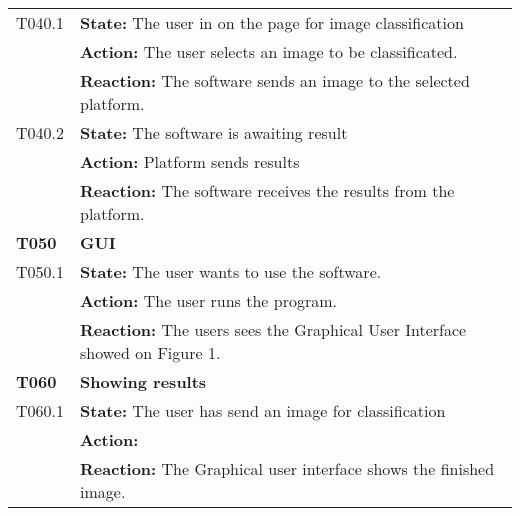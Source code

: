 \documentclass[parskip=full]{scrartcl}
\begin{document}
\begin{tabular}{p{2cm}p{12cm}}
T040.1 & \textbf{State:} The user in on the page for image classification  \\
& \textbf{Action:} The user selects an image to be classificated.  \\
& \textbf{Reaction:} The software sends an image to the selected platform.\\
T040.2 & \textbf{State:} The software is awaiting result \\
& \textbf{Action:} Platform sends results \\
& \textbf{Reaction:} The software receives the results from the platform. \\
\textbf{T050} & \textbf{GUI} \\
T050.1 & \textbf{State:} The user wants to use the software.\\
& \textbf{Action:} The user runs the program.  \\
& \textbf{Reaction:} The users sees the Graphical User Interface showed on Figure 1. \\
\textbf{T060} & \textbf{Showing results} \\
T060.1 & \textbf{State:} The user has send an image for classification \\
& \textbf{Action:} \\
& \textbf{Reaction:} The Graphical user interface shows the finished image. \\ 


\end{tabular}
\end{document}
